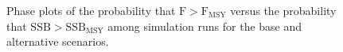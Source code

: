 \documentclass[12pt,english]{article}
\begin{document}
\begin{appendix}
\begin{figure}[!ht]
\begin{center}
\end{center}
\begin{flushleft}
\caption{Phase plots of the probability that $\mathrm{F > F_{MSY}}$  versus  the probability that $\mathrm{SSB > SSB_{MSY}}$ among simulation runs for the base and alternative scenarios.}
\label{fig:phasePlot2}
\end{flushleft}
\end{figure}
\clearpage

\end{appendix}


\end{document}
